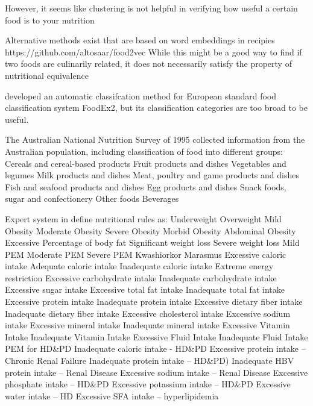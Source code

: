 However, it seems like clustering is not helpful in verifying how useful a certain food is to your nutrition \cite{Kim2015a}

Alternative methods exist that are based on word embeddings in recipies https://github.com/altosaar/food2vec While this might be a good way to find if two foods are culinarily related, it does not necessarily satisfy the property of nutritional equivalence

\cite{Eftimov2017} developed an automatic classifcation method for European standard food classification system FoodEx2, but its classification categories are too broad to be useful.

The Australian National Nutrition Survey of 1995 \cite{NSS1995} collected information from the Australian population, including classification of food into different groups:
Cereals and cereal-based products
Fruit products and dishes
Vegetables and legumes
Milk products and dishes
Meat, poultry and game products and dishes
Fish and seafood products and dishes 
Egg products and dishes 
Snack foods, sugar and confectionery
Other foods
Beverages





Expert system in \cite{Chen2012} define nutritional rules as: 
Underweight
Overweight
Mild Obesity
Moderate Obesity
Severe Obesity
Morbid Obesity
Abdominal Obesity
Excessive Percentage of body fat
Significant weight loss
Severe weight loss
Mild PEM
Moderate PEM
Severe PEM
Kwashiorkor
Marasmus
Excessive caloric intake
Adequate caloric intake
Inadequate caloric intake
Extreme energy restriction
Excessive carbohydrate intake
Inadequate carbohydrate intake
Excessive sugar intake
Excessive total fat intake
Inadequate total fat intake
Excessive protein intake
Inadequate protein intake
Excessive dietary fiber intake
Inadequate dietary fiber intake
Excessive cholesterol intake
Excessive sodium intake
Excessive mineral intake
Inadequate mineral intake
Excessive Vitamin Intake
Inadequate Vitamin Intake
Excessive Fluid Intake
Inadequate Fluid Intake
PEM for HD\&PD
Inadequate caloric intake - HD\&PD
Excessive protein intake – Chronic Renal Failure
Inadequate protein intake – HD\&PD)
Inadequate HBV protein intake – Renal Disease
Excessive sodium intake – Renal Disease
Excessive phosphate intake – HD\&PD
Excessive potassium intake – HD\&PD
Excessive water intake – HD
Excessive SFA intake – hyperlipidemia
